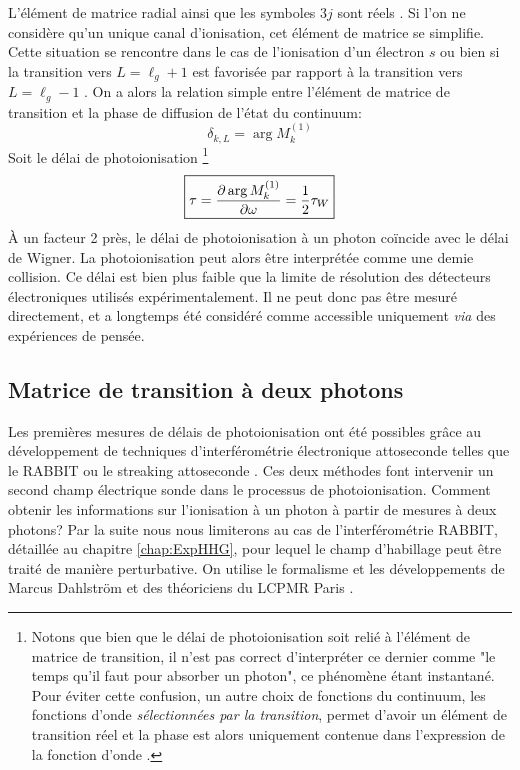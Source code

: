 L'élément de matrice radial ainsi que les symboles $3j$ sont réels . Si l'on ne considère qu'un unique canal d'ionisation, cet élément de matrice se simplifie. Cette situation se rencontre dans le cas de l'ionisation d'un électron $s$ ou bien si la transition vers $L = \ell_g + 1$ est favorisée par rapport à la transition vers $L = \ell_g - 1$ . On a alors la relation simple entre l'élément de matrice de transition et la phase de diffusion de l'état du continuum:
\begin{equation}
\delta_{k,L} = \arg M^{(1)}_{k} 
\end{equation}
Soit le délai de photoionisation \footnote{Notons que bien que le délai de photoionisation soit relié à l'élément de matrice de transition, il n'est pas correct d'interpréter ce dernier comme "le temps qu'il faut pour absorber un photon", ce phénomène étant instantané. Pour éviter cette confusion, un autre choix de fonctions du continuum, les fonctions d'onde \textit{sélectionnées par la transition}, permet d'avoir un élément de transition réel et la phase est alors uniquement contenue dans l'expression de la fonction d'onde .}
\begin{equation}
\setlength\fboxrule{0.5pt}
\boxed{
\tau = \frac{\partial \arg M^{(1)}_{k}}{\partial \omega} = \frac{1}{2} \tau_W
}
\end{equation}
\`A un facteur 2 près, le délai de photoionisation à un photon coïncide avec le délai de Wigner. La photoionisation peut alors être interprétée comme une demie collision. Ce délai est bien plus faible que la limite de résolution des détecteurs électroniques utilisés expérimentalement. Il ne peut donc pas être mesuré directement, et a longtemps été considéré comme accessible uniquement \textit{via} des expériences de pensée.

\subsection{Matrice de transition à deux photons}
\label{sec:Matrice2photons}
Les premières mesures de délais de photoionisation ont été possibles grâce au développement de techniques d'interférométrie électronique attoseconde telles que le RABBIT  ou le streaking attoseconde . Ces deux méthodes font intervenir un second champ électrique sonde dans le processus de photoionisation. Comment obtenir les informations sur l'ionisation à un photon à partir de mesures à deux photons? Par la suite nous nous limiterons au cas de l'interférométrie RABBIT, détaillée au chapitre \ref{chap:ExpHHG}, pour lequel le champ d'habillage peut être traité de manière perturbative. On utilise le formalisme et les développements de Marcus Dahlström et des théoriciens du LCPMR Paris .

